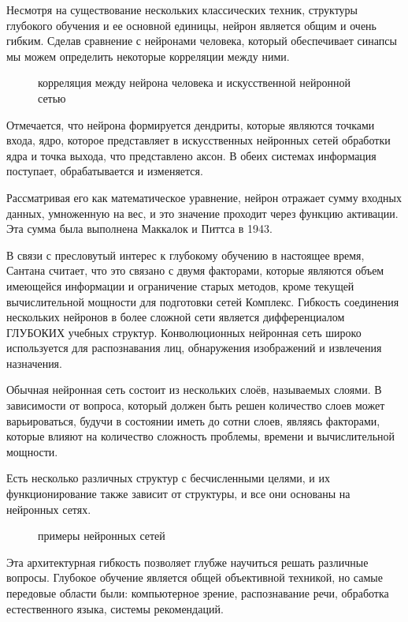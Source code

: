 Несмотря на существование нескольких классических техник, структуры глубокого обучения и ее основной единицы,
 нейрон является общим и очень гибким. Сделав сравнение с нейронами человека,
 который обеспечивает синапсы мы можем определить некоторые корреляции между ними. 

 \begin{figure*}[h]
    \caption{корреляция между нейрона человека и искусственной нейронной сетью}
 \end{figure*}

 Отмечается, что нейрона формируется дендриты, которые являются точками входа, ядро, 
 которое представляет в искусственных нейронных сетей обработки ядра и точка выхода, что представлено аксон. 
 В обеих системах информация поступает, обрабатывается и изменяется. 

 Рассматривая его как математическое уравнение, нейрон отражает сумму входных данных, 
 умноженную на вес, и это значение проходит через функцию активации. 
 Эта сумма была выполнена Маккалок и Питтса в 1943.

 В связи с пресловутый интерес к глубокому обучению в настоящее время, Сантана считает,
 что это связано с двумя факторами, которые являются объем имеющейся информации и ограничение старых методов,
 кроме текущей вычислительной мощности для подготовки сетей Комплекс. 
 Гибкость соединения нескольких нейронов в более сложной сети является дифференциалом ГЛУБОКИХ учебных структур.
 Конволюционных нейронная сеть широко используется для распознавания лиц, обнаружения изображений и извлечения назначения.

 Обычная нейронная сеть состоит из нескольких слоёв, называемых слоями.
 В зависимости от вопроса, который должен быть решен количество слоев может варьироваться, 
 будучи в состоянии иметь до сотни слоев, являясь факторами,
 которые влияют на количество сложность проблемы, 
 времени и вычислительной мощности. 

 Есть несколько различных структур с бесчисленными целями,
 и их функционирование также зависит от структуры,
 и все они основаны на нейронных сетях.

 \begin{figure*}[h]
     \caption{примеры нейронных сетей}
 \end{figure*}

 Эта архитектурная гибкость позволяет глубже научиться решать различные вопросы.
 Глубокое обучение является общей объективной техникой, но самые передовые области были:
 компьютерное зрение, распознавание речи, обработка естественного языка, системы рекомендаций.

